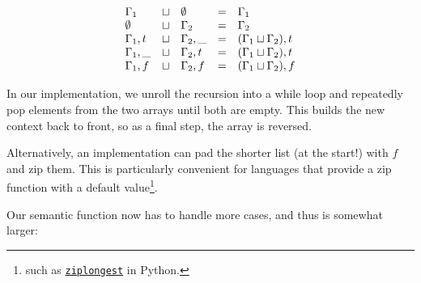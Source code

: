 \documentclass[conference]{IEEEtran}
\begin{document}
\begin{equation*}
    \begin{array}{l l l l l}
        \Gamma_1    & \sqcup & \emptyset   & = & \Gamma_1                     \\
        \emptyset   & \sqcup & \Gamma_2    & = & \Gamma_2                     \\
        \Gamma_1,t  & \sqcup & \Gamma_2,\_ & = & (\Gamma_1 \sqcup \Gamma_2),t \\
        \Gamma_1,\_ & \sqcup & \Gamma_2,t  & = & (\Gamma_1 \sqcup \Gamma_2),t \\
        \Gamma_1,f  & \sqcup & \Gamma_2,f  & = & (\Gamma_1 \sqcup \Gamma_2),f \\
    \end{array}
\end{equation*}

In our implementation, we unroll the recursion into a while loop and repeatedly pop elements from the two arrays until both are empty.
This builds the new context back to front, so as a final step, the array is reversed.

Alternatively, an implementation can pad the shorter list (at the start!) with $f$ and zip them.
This is particularly convenient for languages that provide a zip function with a default value\footnote{such as \href{https://docs.python.org/3/library/itertools.html\#itertools.zip\_longest}{\texttt{ziplongest}} in Python.}.

Our semantic function now has to handle more cases, and thus is somewhat larger:
\end{document}
